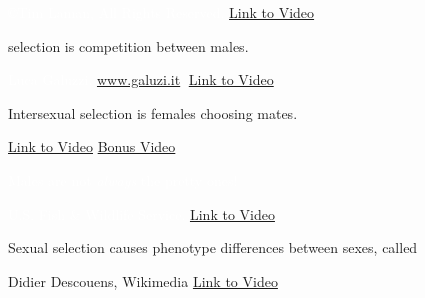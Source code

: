 \documentclass[t,handout]{beamer}  %
\begin{document}
{
\begin{frame}[b]{\hfill{}}

	\tiny \textcolor{white}{\copyright Tim Laman, All Rights Reserved. 
	\hfill \href{http://www.youtube.com/watch?v=KIYkpwyKEhY}{Link to Video} }
	
\end{frame}
}
%
{
\begin{frame}[b]{ selection is competition between males.}

	\tiny \textcolor{white}{Luca Galuzzi, \href{http://www.galuzi.it}{www.galuzi.it}, 
	\hfill \href{http://www.youtube.com/watch?v=C7HCIGFdBt8}{Link to Video}}

\end{frame}
}
%
{
\begin{frame}[b]{\textcolor{orange5}{Intersexual} \textcolor{white!95!black}{selection is females choosing mates.}}

	\tiny \textcolor{white}{\href{https://youtu.be/IPfW7iolmgc}{Link to Video} 
	\hfill \href{https://youtu.be/1XkPeN3AWIE}{Bonus Video}}
	
\end{frame}
}
%
{
\begin{frame}[b]{\textcolor{white}{Males are not \textit{always} the pretty ones!}}

	\tiny \textcolor{white}{U.S. Fish \& Wildlife Service.
	\hfill \href{https://youtu.be/15ZXpbKrZfI}{Link to Video}}
	
\end{frame}
}
%
{
\begin{frame}[b]{Sexual selection causes phenotype differences between sexes, called }

	\tiny Didier Descouens, Wikimedia 
	\hfill \href{http://www.youtube.com/watch?v=_VBz0FaXN1c}{Link to Video}
	
\end{frame}
}
%
\end{document}
